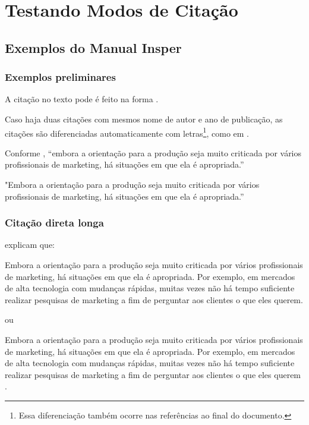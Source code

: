 \chapter{Testando Modos de Citação}
\section{Exemplos do Manual Insper}

\subsection{Exemplos preliminares}

A citação no texto pode é feito na forma \textcite{rego1994pureza}.

Caso haja duas citações com mesmos nome de autor e ano de publicação, as citações são diferenciadas automaticamente com letras\footnote{Essa diferenciação também ocorre nas referências ao final do documento.}, como em \textcite{rego1994usina}.

Conforme \textcite[8]{churchill2012marketing}, “embora a orientação para a produção seja muito criticada por vários profissionais de marketing, há situações em que ela é apropriada.”

"Embora a orientação para a produção seja muito criticada por vários
profissionais de marketing, há situações em que ela é apropriada.” \parencite[8]{churchill2012marketing} 

\subsection{Citação direta longa}

\textcite[8]{churchill2012marketing} explicam que:

\begin{citacao}
Embora a orientação para a produção seja muito criticada
por vários profissionais de marketing, há situações em
que ela é apropriada. Por exemplo, em mercados de alta
tecnologia com mudanças rápidas, muitas vezes não há
tempo suficiente realizar pesquisas de marketing a fim de
perguntar aos clientes o que eles querem.
\end{citacao}

ou

\begin{citacao}
Embora a orientação para a produção seja muito criticada
por vários profissionais de marketing, há situações em
que ela é apropriada. Por exemplo, em mercados de alta
tecnologia com mudanças rápidas, muitas vezes não há
tempo suficiente realizar pesquisas de marketing a fim de
perguntar aos clientes o que eles querem \parencite{churchill2012marketing}.
\end{citacao}

